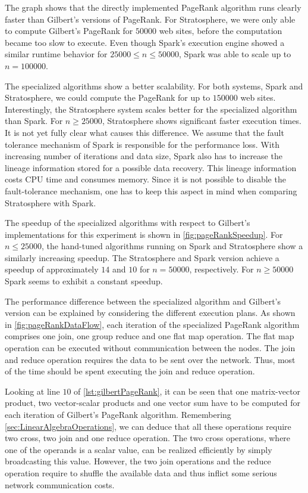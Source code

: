 The graph shows that the directly implemented PageRank algorithm runs clearly faster than Gilbert's versions of PageRank.
For Stratosphere, we were only able to compute Gilbert's PageRank for $50000$ web sites, before the computation became too slow to execute.
Even though Spark's execution engine showed a similar runtime behavior for $25000 \le n \le 50000$, Spark was able to scale up to $n=100000$.

The specialized algorithms show a better scalability.
For both systems, Spark and Stratosphere, we could compute the PageRank for up to $150000$ web sites.
Interestingly, the Stratosphere system scales better for the specialized algorithm than Spark.
For $n\ge 25000$, Stratosphere shows significant faster execution times.
It is not yet fully clear what causes this difference.
We assume that the fault tolerance mechanism of Spark is responsible for the performance loss.
With increasing number of iterations and data size, Spark also has to increase the lineage information stored for a possible data recovery.
This lineage information costs CPU time and consumes memory.
Since it is not possible to disable the fault-tolerance mechanism, one has to keep this aspect in mind when comparing Stratosphere with Spark.

The speedup of the specialized algorithms with respect to Gilbert's implementations for this experiment is shown in \cref{fig:pageRankSpeedup}.
For $n\le 25000$, the hand-tuned algorithms running on Spark and Stratosphere show a similarly increasing speedup.
The Stratosphere and Spark version achieve a speedup of approximately $14$ and $10$ for $n=50000$, respectively.
For $n\ge 50000$ Spark seems to exhibit a constant speedup.

The performance difference between the specialized algorithm and Gilbert's version can be explained by considering the different execution plans.
As shown in \cref{fig:pageRankDataFlow}, each iteration of the specialized PageRank algorithm comprises one join, one group reduce and one flat map operation.
The flat map operation can be executed without communication between the nodes.
The join and reduce operation requires the data to be sent over the network.
Thus, most of the time should be spent executing the join and reduce operation.

Looking at line $10$ of \cref{lst:gilbertPageRank}, it can be seen that one matrix-vector product, two vector-scalar products and one vector sum have to be computed for each iteration of Gilbert's PageRank algorithm.
Remembering \cref{sec:LinearAlgebraOperations}, we can deduce that all these operations require two cross, two join and one reduce operation.
The two cross operations, where one of the operands is a scalar value, can be realized efficiently by simply broadcasting this value.
However, the two join operations and the reduce operation require to shuffle the available data and thus inflict some serious network communication costs.

